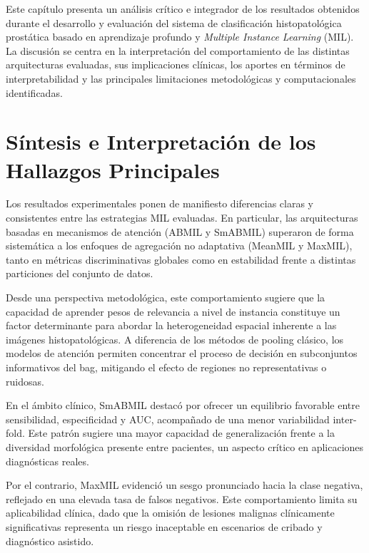 Este capítulo presenta un análisis crítico e integrador de los resultados obtenidos durante el desarrollo y evaluación del sistema de clasificación histopatológica prostática basado en aprendizaje profundo y \textit{Multiple Instance Learning} (MIL). La discusión se centra en la interpretación del comportamiento de las distintas arquitecturas evaluadas, sus implicaciones clínicas, los aportes en términos de interpretabilidad y las principales limitaciones metodológicas y computacionales identificadas.

\section{Síntesis e Interpretación de los Hallazgos Principales}
Los resultados experimentales ponen de manifiesto diferencias claras y consistentes entre las estrategias MIL evaluadas. En particular, las arquitecturas basadas en mecanismos de atención (ABMIL y SmABMIL) superaron de forma sistemática a los enfoques de agregación no adaptativa (MeanMIL y MaxMIL), tanto en métricas discriminativas globales como en estabilidad frente a distintas particiones del conjunto de datos.\newline

Desde una perspectiva metodológica, este comportamiento sugiere que la capacidad de aprender pesos de relevancia a nivel de instancia constituye un factor determinante para abordar la heterogeneidad espacial inherente a las imágenes histopatológicas. A diferencia de los métodos de pooling clásico, los modelos de atención permiten concentrar el proceso de decisión en subconjuntos informativos del bag, mitigando el efecto de regiones no representativas o ruidosas.\newline

En el ámbito clínico, SmABMIL destacó por ofrecer un equilibrio favorable entre sensibilidad, especificidad y AUC, acompañado de una menor variabilidad inter-fold. Este patrón sugiere una mayor capacidad de generalización frente a la diversidad morfológica presente entre pacientes, un aspecto crítico en aplicaciones diagnósticas reales.\newline

Por el contrario, MaxMIL evidenció un sesgo pronunciado hacia la clase negativa, reflejado en una elevada tasa de falsos negativos. Este comportamiento limita su aplicabilidad clínica, dado que la omisión de lesiones malignas clínicamente significativas representa un riesgo inaceptable en escenarios de cribado y diagnóstico asistido.

